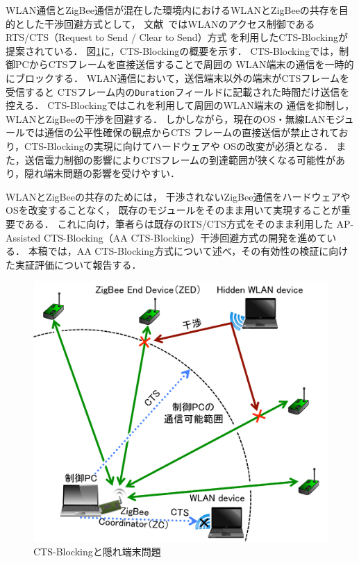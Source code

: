 \documentclass[technicalreport]{ieicej}
\begin{document}
WLAN通信とZigBee通信が混在した環境内におけるWLANとZigBeeの共存を目的とした干渉回避方式として，
文献~\cite{Hou09:}ではWLANのアクセス制御であるRTS/CTS（Request to Send / Clear to Send）方式
を利用したCTS-Blockingが提案されている．
図\ref{fig:cts_blocking}に，CTS-Blockingの概要を示す．
CTS-Blockingでは，制御PCからCTSフレームを直接送信することで周囲の
WLAN端末の通信を一時的にブロックする．
WLAN通信において，送信端末以外の端末がCTSフレームを受信すると
CTSフレーム内の\texttt{Duration}フィールドに記載された時間だけ送信を控える．
CTS-Blockingではこれを利用して周囲のWLAN端末の
通信を抑制し，WLANとZigBeeの干渉を回避する．
しかしながら，現在のOS・無線LANモジュールでは通信の公平性確保の観点からCTS
フレームの直接送信が禁止されており，CTS-Blockingの実現に向けてハードウェアや
OSの改変が必須となる．
また，送信電力制御の影響によりCTSフレームの到達範囲が狭くなる可能性があり，隠れ端末問題の影響を受けやすい．

WLANとZigBeeの共存のためには，%
干渉されないZigBee通信をハードウェアやOSを改変することなく，
既存のモジュールをそのまま用いて実現することが重要である．
これに向け，筆者らは既存のRTS/CTS方式をそのまま利用した
AP-Assisted CTS-Blocking（AA CTS-Blocking）干渉回避方式の開発を進めている．
本稿では，AA CTS-Blocking方式について述べ，その有効性の検証に向けた実証評価について報告する．

\begin{figure}[bt]
 \centering
 \includegraphics[width=\columnwidth]{figure/cts_blocking.pdf}
 \caption{CTS-Blockingと隠れ端末問題}
 \label{fig:cts_blocking}
\end{figure}
\end{document}
